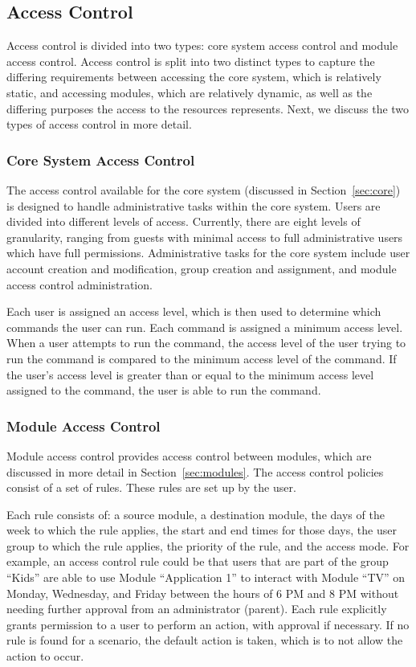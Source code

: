 \subsection{Access Control}
\label{sec:access}
Access control is divided into two types: core system access control and module
access control. Access control is split into two distinct types to capture the
differing requirements between accessing the core system, which is relatively
static, and accessing modules, which are relatively dynamic, as well as the
differing purposes the access to the resources represents. Next, we discuss the
two types of access control in more detail.
\subsubsection{Core System Access Control}
\label{sec:core_access}
The access control available for the core system (discussed in
Section~\ref{sec:core}) is designed to handle administrative tasks within the
core system. Users are divided into different levels of access. Currently, there
are eight levels of granularity, ranging from guests with minimal access to
full administrative users which have full permissions. Administrative tasks for
the core system include user account creation and modification, group creation
and assignment, and module access control administration.

Each user is assigned an access level, which is then used to determine which
commands the user can run. Each command is assigned a minimum access level.
When a user attempts to run the command, the access level of the user trying to
run the command is compared to the minimum access level of the command. If the
user's access level is greater than or equal to the minimum access level
assigned to the command, the user is able to run the command.
\subsubsection{Module Access Control}
\label{sec:module_access}
Module access control provides access control between modules, which are
discussed in more detail in Section~\ref{sec:modules}. The access control
policies consist of a set of rules. These rules are set up by the user.

Each rule consists of: a source module, a destination module, the days of the
week to which the rule applies, the start and end times for those days, the user
group to which the rule applies, the priority of the rule, and the access mode.
For example, an access control rule could be that users that are part of the
group ``Kids'' are able to use Module ``Application 1'' to interact with Module
``TV'' on Monday, Wednesday, and Friday between the hours of 6 PM and 8 PM
without needing further approval from an administrator (parent). Each rule
explicitly grants permission to a user to perform an action, with approval if
necessary. If no rule is found for a scenario, the default action is taken,
which is to not allow the action to occur.

